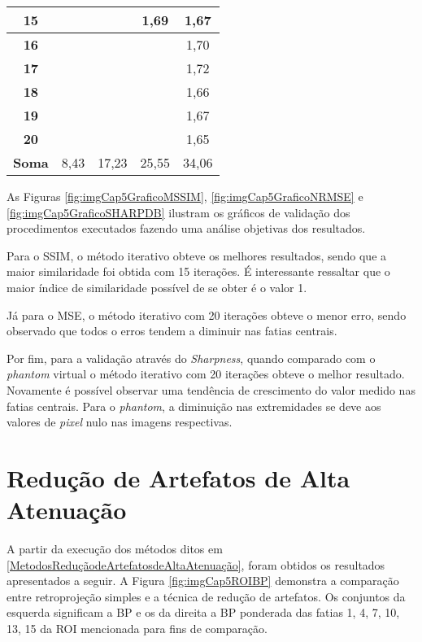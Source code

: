\begin{table}[H]
\begin{tabular}{c|c|c|c|c}
		\hline
		\textbf{15}&     &      & 1,69 & 1,67 \\
		\hline
		\textbf{16}&     &      &      & 1,70 \\
		\hline
		\textbf{17}&     &      &      & 1,72 \\
		\hline
		\textbf{18}&     &      &      & 1,66 \\
		\hline
		\textbf{19}&     &      &      & 1,67 \\
		\hline
		\textbf{20}&     &      &      & 1,65 \\
		\hline
		\rowcolor{lightgray}\textbf{Soma} &8,43   	   & 17,23      & 25,55      & 34,06  \\
		\hline
	\end{tabular}
	\vspace{2ex}
\end{table}  



As Figuras \ref{fig:imgCap5GraficoMSSIM}, \ref{fig:imgCap5GraficoNRMSE} e \ref{fig:imgCap5GraficoSHARPDB} ilustram os gráficos de validação dos procedimentos executados fazendo uma análise objetivas dos resultados. 

Para o \acs{SSIM}, o método iterativo obteve os melhores resultados, sendo que a maior similaridade foi obtida com 15 iterações. É interessante ressaltar que o maior índice de similaridade possível de se obter é o valor 1. 

Já para o \acs{MSE}, o método iterativo com 20 iterações obteve o menor erro, sendo observado que todos o erros tendem a diminuir nas fatias centrais. 

Por fim, para a validação através do \textit{Sharpness}, quando comparado com o \textit{phantom} virtual o método iterativo com 20 iterações obteve o melhor resultado. Novamente é possível observar uma tendência de crescimento do valor medido nas fatias centrais. Para o \textit{phantom}, a diminuição nas extremidades se deve aos valores de \textit{pixel} nulo nas imagens respectivas.   

\section{Redução de Artefatos de Alta Atenuação}

A partir da execução dos métodos ditos em \ref{MetodosReduçãodeArtefatosdeAltaAtenuação}, foram obtidos os resultados apresentados a seguir. A Figura \ref{fig:imgCap5ROIBP} demonstra a comparação entre retroprojeção simples e a técnica de redução de artefatos. Os conjuntos da esquerda significam a \acs{BP} e os da direita a \acs{BP} ponderada das fatias 1, 4, 7, 10, 13, 15 da \acs{ROI} mencionada para fins de comparação.

